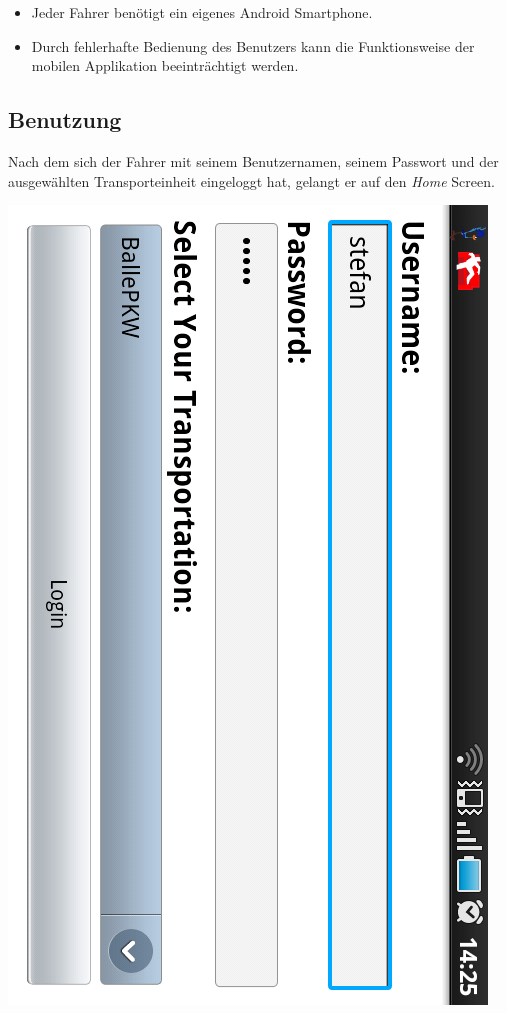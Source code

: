 \begin{itemize}
 \item Jeder Fahrer benötigt ein eigenes Android Smartphone.
 \item Durch fehlerhafte Bedienung des Benutzers kann die Funktionsweise der mobilen Applikation beeinträchtigt werden.
\end{itemize} 
	
\subsection{Benutzung}

Nach dem sich der Fahrer mit seinem Benutzernamen, seinem Passwort und der ausgewählten Transporteinheit eingeloggt hat, gelangt er auf den \emph{Home} Screen.

\includegraphics{../files/android_app_login.png}

